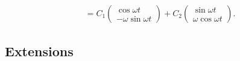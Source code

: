 \documentclass[12pt]{report}
\theoremstyle{definition}
\begin{document}
\begin{ex}
\begin{enumerate}[label = (\roman*)]
\begin{enumerate}[label = (\alph*)]
\[\begin{align*}
                            & = C_1 \begin{pmatrix}
                                \cos{\omega t} \\
                                -\omega \sin{\omega t}
                            \end{pmatrix} + C_2\begin{pmatrix}
                            \sin{\omega t} \\
                            \omega \cos{\omega t}
                            \end{pmatrix}.
                            \end{align*}
                        \]
                  \end{enumerate}
    \end{enumerate}
\end{ex}

\subsection{Extensions}
\end{document}
